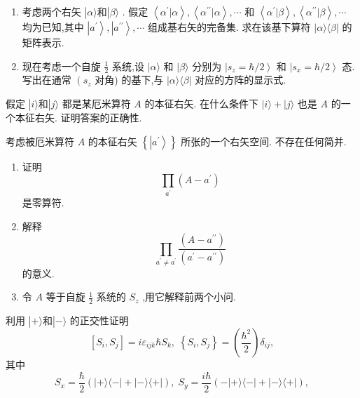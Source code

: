 \documentclass[lang=cn,newtx,10pt,scheme=chinese,thmcnt=section]{elegantbook}
\begin{document}
\begin{problemset}
\begin{enumerate}
	\end{enumerate}
	\item
	\begin{enumerate}
		\item 考虑两个右矢 $\left| {\alpha \rangle \text{和}}\right| \beta \rangle$ . 假定 $\left\langle {{\alpha }^{\prime } | \alpha }\right\rangle ,\left\langle {{\alpha }^{\prime \prime } | \alpha }\right\rangle ,\cdots$ 和 $\left\langle {{\alpha }^{\prime } | \beta }\right\rangle ,\left\langle {{\alpha }^{\prime \prime } | \beta }\right\rangle ,\cdots$ 均为已知,其中 $\left| {a}^{\prime }\right\rangle ,\left| {a}^{\prime \prime }\right\rangle ,\cdots$ 组成基右矢的完备集. 求在该基下算符 $|\alpha \rangle \langle \beta |$ 的矩阵表示.
		\item 现在考虑一个自旋 $\frac{1}{2}$ 系统,设 $|\alpha \rangle$ 和 $|\beta \rangle$ 分别为 $\left| {{s}_{z} = \hbar /2}\right\rangle$ 和 $\left| {{s}_{x} = \hbar /2}\right\rangle$ 态. 写出在通常 $\left( {s}_{z}\right.$ 对角) 的基下,与 $\left| {\alpha \rangle \langle \beta }\right|$ 对应的方阵的显示式.
	\end{enumerate}
	\item 假定 $\left| {i\rangle \text{和}}\right| j\rangle$ 都是某厄米算符 $A$ 的本征右矢. 在什么条件下 $\left| {i\rangle + }\right| j\rangle$ 也是 $A$ 的一个本征右矢. 证明答案的正确性.
	\item 考虑被厄米算符 $A$ 的本征右矢 $\left\{ \left| {a}^{\prime }\right\rangle \right\}$ 所张的一个右矢空间. 不存在任何简并.
	\begin{enumerate}
		\item 证明
		$$
		\mathop{\prod }\limits_{{a}^{\prime }}\left( {A - {a}^{\prime }}\right)
		$$
		是零算符.
		\item 解释
		$$
		\mathop{\prod }\limits_{{{a}^{\prime } \neq {a}^{\prime }}}\frac{\left( A - {a}^{\prime \prime }\right) }{\left( {a}^{\prime } - {a}^{\prime \prime }\right) }
		$$
		的意义.
		\item 令 $A$ 等于自旋 $\frac{1}{2}$ 系统的 ${S}_{z}$ ,用它解释前两个小问.
	\end{enumerate}
	\item 利用 $\left| {+\rangle \text{和}}\right| - \rangle$ 的正交性证明
	$$
	\left\lbrack {{S}_{i},{S}_{j}}\right\rbrack = i{\varepsilon }_{ijk}\hbar {S}_{k},\;\left\{ {{S}_{i},{S}_{j}}\right\} = \left( \frac{{\hbar }^{2}}{2}\right) {\delta }_{ij},
	$$
	其中
	$$
	{S}_{x} = \frac{\hbar }{2}\left( {\left| {+\rangle \langle - }\right| + \left| {-\rangle \langle + }\right| }\right) ,\;{S}_{y} = \frac{i\hbar }{2}\left( {-\left| {+\rangle \langle - }\right| + \left| {-\rangle \langle + }\right| }\right) ,
$$
\end{problemset}
\end{document}
